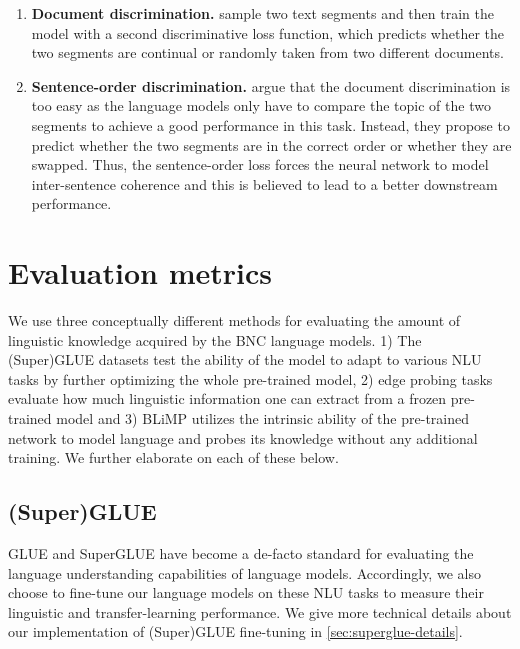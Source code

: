     \begin{enumerate}
        \item \textbf{Document discrimination.}  sample two text segments and then train the model with a second discriminative loss function, which predicts whether the two segments are continual or randomly taken from two different documents.
        
        \item \textbf{Sentence-order discrimination.}  argue that the document discrimination is too easy as the language models only have to compare the topic of the two segments to achieve a good performance in this task. Instead, they propose to predict whether the two segments are in the correct order or whether they are swapped. Thus, the sentence-order loss forces the neural network to model inter-sentence coherence and this is believed to lead to a better downstream performance.
    \end{enumerate}
    
    
    
    \section{Evaluation metrics}
    \label{sec:metrics}
    
    We use three conceptually different methods for evaluating the amount of linguistic knowledge acquired by the BNC language models. 1) The (Super)GLUE datasets test the ability of the model to adapt to various NLU tasks by further optimizing the whole pre-trained model, 2) edge probing tasks evaluate how much linguistic information one can extract from a frozen pre-trained model and 3) BLiMP utilizes the intrinsic ability of the pre-trained network to model language and probes its knowledge without any additional training. We further elaborate on each of these below. 
    
    \subsection{(Super)GLUE}

    GLUE \citep{wang-etal-2018-glue} and SuperGLUE \citep{NEURIPS2019_4496bf24} have become a de-facto standard for evaluating the language understanding capabilities of language models. Accordingly, we also choose to fine-tune our language models on these NLU tasks to measure their linguistic and transfer-learning performance. We give more technical details about our implementation of (Super)GLUE fine-tuning in \cref{sec:superglue-details}.

